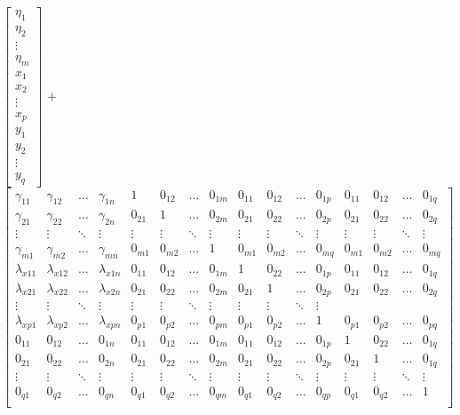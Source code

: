 \documentclass[man]{apa6}
\theoremstyle{definition}
\theoremstyle{definition}
\theoremstyle{definition}
\theoremstyle{remark}
\begin{document}
\(\begin{bmatrix}  \eta_{1} \\  \eta_{2} \\  \vdots \\  \eta_{m} \\  x_{1} \\  x_{2} \\  \vdots \\  x_{p} \\  y_{1} \\  y_{2} \\  \vdots \\  y_{q} \end{bmatrix}\)
\(+\)
\(\begin{bmatrix}  \gamma_{11} & \gamma_{12} & \dots & \gamma_{1n} & 1 & 0_{12} & \dots & 0_{1m} & 0_{11} & 0_{12} & \dots & 0_{1p} & 0_{11} & 0_{12} & \dots & 0_{1q} \\  \gamma_{21} & \gamma_{22} & \dots & \gamma_{2n} & 0_{21} & 1 & \dots & 0_{2m} & 0_{21} & 0_{22} & \dots & 0_{2p} & 0_{21} & 0_{22} & \dots & 0_{2q} \\  \vdots & \vdots & \ddots & \vdots & \vdots & \vdots & \ddots & \vdots &\vdots &\vdots & \ddots & \vdots &\vdots &\vdots & \ddots & \vdots \\  \gamma_{m1} & \gamma_{m2} & \dots & \gamma_{mn} & 0_{m1} & 0_{m2} & \dots & 1 & 0_{m1} & 0_{m2} & \dots & 0_{mq} & 0_{m1} & 0_{m2} & \dots & 0_{mq} \\  \lambda_{x11} & \lambda_{x12} & \dots & \lambda_{x1n} & 0_{11} & 0_{12} & \dots & 0_{1m} & 1 & 0_{22} & \dots & 0_{1p} & 0_{11} & 0_{12} & \dots & 0_{1q}\\  \lambda_{x21} & \lambda_{x22} & \dots & \lambda_{x2n} & 0_{21} & 0_{22} & \dots & 0_{2m} & 0_{21} & 1 & \dots & 0_{2p} & 0_{21} & 0_{22} & \dots & 0_{2q}\\  \vdots & \vdots & \ddots & \vdots & \vdots & \vdots & \ddots & \vdots &\vdots &\vdots & \ddots & \vdots \\  \lambda_{xp1} & \lambda_{xp2} & \dots & \lambda_{xpn} & 0_{p1} & 0_{p2} & \dots & 0_{pm} & 0_{p1} & 0_{p2} & \dots & 1 & 0_{p1} & 0_{p2} & \dots & 0_{pq}\\  0_{11} & 0_{12} & \dots & 0_{1n} & 0_{11} & 0_{12} & \dots & 0_{1m} & 0_{11} & 0_{12} & \dots & 0_{1p} & 1 & 0_{22} & \dots & 0_{1q} \\  0_{21} & 0_{22} & \dots & 0_{2n} & 0_{21} & 0_{22} & \dots & 0_{2m} & 0_{21} & 0_{22} & \dots & 0_{2p} & 0_{21} & 1 & \dots & 0_{1q}\\  \vdots & \vdots & \ddots & \vdots & \vdots & \vdots & \ddots & \vdots &\vdots &\vdots & \ddots & \vdots &\vdots &\vdots & \ddots & \vdots \\  0_{q1} & 0_{q2} & \dots & 0_{qn} & 0_{q1} & 0_{q2} & \dots & 0_{qm} & 0_{q1} & 0_{q2} & \dots & 0_{qp} & 0_{q1} & 0_{q2} & \dots & 1 \\ \end{bmatrix}\)
\end{document}
